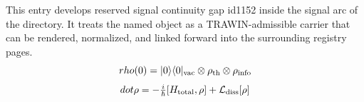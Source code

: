
\begin{tzpsnapshot}
\end{tzpsnapshot}

This entry develops reserved signal continuity gap id1152 inside the signal arc of the directory. It treats the named object as a TRAWIN-admissible carrier that can be rendered, normalized, and linked forward into the surrounding registry pages.
\[
rho(0)=|0\rangle\langle0|_{\rm vac}\otimes\rho_{\rm th}\otimes\rho_{\rm info}
\]
\[
dot\rho = -\tfrac{i}{\hbar}[H_{\rm total},\rho]+\mathcal L_{\rm diss}[\rho]
\]

